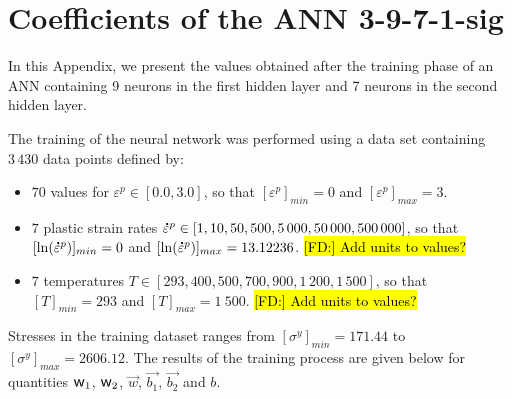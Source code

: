 \documentclass[preprint,12pt,times]{elsarticle}
\newcommand{\w}{\mbox{\large\ensuremath{\mathsf{w}}}}
\newcommand{\mdot}[1]{\accentset{\mbox{\bfseries .}}{#1}}
\DeclareRobustCommand{\FD}[1]{ {\begingroup\sethlcolor{VWgreen}\textcolor{black}{\hl{[FD:] #1}}\endgroup} }
\begin{document}
%
%


%
%
%
%


%
%
%

\appendix
%
\section{Coefficients of the ANN 3-9-7-1-sig\label{sec:appendix-1}}

In this Appendix, we present the values obtained after the training phase of an ANN containing 9 neurons in the first hidden layer and 7 neurons in the second hidden layer.

The training of the neural network was performed using a data set containing $3\,430$ data points defined by:
\begin{itemize}
\item $70$ values for $\varepsilon^p\in[0.0,3.0]$, so that $[\varepsilon^p]_{min}=0$ and $[\varepsilon^p]_{max}=3$.
\item $7$ plastic strain rates $\mdot{\varepsilon}^p\in[1, 10, 50, 500, 5\,000, 50\,000, 500\,000]$, so that $[\ln(\mdot{\varepsilon}^p)]_{min}=0$ and $[\ln(\mdot{\varepsilon}^p)]_{max}=13.12236$. \FD{Add units to values?}
\item  $7$ temperatures $T\in[293, 400, 500, 700, 900, 1\,200, 1\,500]$, so that $[T]_{min}=293$ and $[T]_{max}=1\ 500$. \FD{Add units to values?}
\end{itemize}

Stresses in the training dataset ranges from $[\sigma^y]_{min}=171.44$ to $[\sigma^y]_{max}=2606.12$.
The results of the training process are given below for quantities $\w_1$, $\w_2$, $\overrightarrow{w}$, $\overrightarrow{b_1}$, $\overrightarrow{b_2}$ and $b$.
\end{document}
